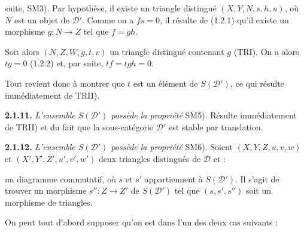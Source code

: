 \clearpage
{}%
\begingroup
\small
\setlength{\emergencystretch}{1.5em}%
\setlength{\abovedisplayskip}{2pt plus 1pt minus 1pt}%
\setlength{\belowdisplayskip}{2pt plus 1pt minus 1pt}%

\noindent suite, SM3).
%
Par hypothèse, il existe un triangle distingué
$(X,Y,N,s,h,u)$, où $N$ est un objet de $\mathcal D'$. Comme on a $fs=0$, il
résulte de (1.2.1) qu'il existe un morphisme $g\colon N\to Z$ tel que $f=gh$.

Soit alors $(N,Z,W,g,t,v)$ un triangle distingué contenant $g$ (TRI). On a
alors $tg=0$ (1.2.2) et, par suite, $tf=tgh=0$.

Tout revient donc à montrer que $t$ est un élément de $S(\mathcal D')$, ce
qui résulte immédiatement de TRII).

\medskip
\noindent\textbf{2.1.11.}\quad
{}
\emph{L'ensemble $S(\mathcal D')$ possède la propriété} SM5).
Résulte immédiatement de TRII) et du fait que la sous-catégorie $\mathcal D'$
est stable par translation.

\medskip
\noindent\textbf{2.1.12.}\quad
{}
\emph{L'ensemble $S(\mathcal D')$ possède la propriété} SM6).
Soient $(X,Y,Z,u,v,w)$ et $(X',Y',Z',u',v',w')$ deux triangles distingués de
$\mathcal D$ et :

\begin{center}
\end{center}

\noindent un diagramme commutatif, où $s$ et $s'$ appartiennent à
$S(\mathcal D')$. Il s'agit de trouver un morphisme $s''\colon Z\to Z'$ de
$S(\mathcal D')$ tel que $(s,s',s'')$ soit un morphisme de triangles.

On peut tout d'abord supposer qu'on est dans l'un des deux cas suivants :

